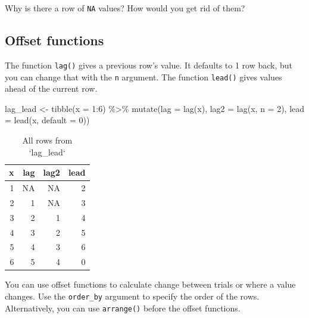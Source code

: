 \documentclass[
  oneside]{book}
\newenvironment{Shaded}{\begin{snugshade}}{\end{snugshade}}
\newcommand{\AttributeTok}[1]{\textcolor[rgb]{0.77,0.63,0.00}{#1}}
\newcommand{\DecValTok}[1]{\textcolor[rgb]{0.00,0.00,0.81}{#1}}
\newcommand{\FunctionTok}[1]{\textcolor[rgb]{0.00,0.00,0.00}{#1}}
\newcommand{\NormalTok}[1]{#1}
\newcommand{\OtherTok}[1]{\textcolor[rgb]{0.56,0.35,0.01}{#1}}
\newcommand{\SpecialCharTok}[1]{\textcolor[rgb]{0.00,0.00,0.00}{#1}}
\begin{document}
\begin{try}
Why is there a row of \texttt{NA} values? How would you get rid of them?

\end{try}

\hypertarget{offset-functions}{%
\subsection{Offset functions}\label{offset-functions}}

The function \texttt{lag()} gives a previous row's value. It defaults to 1 row back, but you can change that with the \texttt{n} argument. The function \texttt{lead()} gives values ahead of the current row.

\begin{Shaded}
\begin{Highlighting}[]
\NormalTok{lag\_lead }\OtherTok{\textless{}{-}} \FunctionTok{tibble}\NormalTok{(}\AttributeTok{x =} \DecValTok{1}\SpecialCharTok{:}\DecValTok{6}\NormalTok{) }\SpecialCharTok{\%\textgreater{}\%}
  \FunctionTok{mutate}\NormalTok{(}\AttributeTok{lag =} \FunctionTok{lag}\NormalTok{(x),}
         \AttributeTok{lag2 =} \FunctionTok{lag}\NormalTok{(x, }\AttributeTok{n =} \DecValTok{2}\NormalTok{),}
         \AttributeTok{lead =} \FunctionTok{lead}\NormalTok{(x, }\AttributeTok{default =} \DecValTok{0}\NormalTok{))}
\end{Highlighting}
\end{Shaded}

\begin{table}

\caption{\label{tab:unnamed-chunk-3}All rows from `lag_lead`}
\centering
\begin{tabular}[t]{r|r|r|r}
\hline
x & lag & lag2 & lead\\
\hline
1 & NA & NA & 2\\
\hline
2 & 1 & NA & 3\\
\hline
3 & 2 & 1 & 4\\
\hline
4 & 3 & 2 & 5\\
\hline
5 & 4 & 3 & 6\\
\hline
6 & 5 & 4 & 0\\
\hline
\end{tabular}
\end{table}

You can use offset functions to calculate change between trials or where a value changes. Use the \texttt{order\_by} argument to specify the order of the rows. Alternatively, you can use \texttt{arrange()} before the offset functions.
\end{document}
